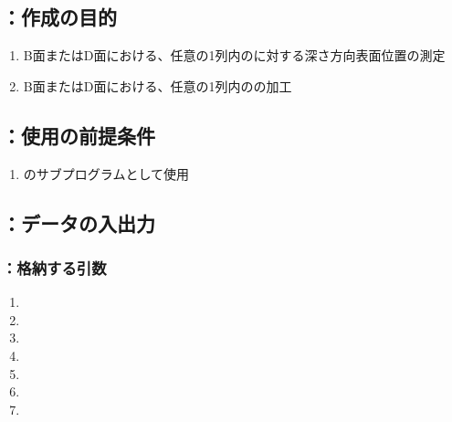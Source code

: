 \clearpage


\subsection{\DLtwoBD：作成の目的}
\begin{enumerate}[label*=\sarrow]
\item B面またはD面における、任意の1列内の\Dimple に対する深さ方向表面位置の測定
\item B面またはD面における、任意の1列内の\Dimple の加工
\end{enumerate}


\subsection{\DLtwoBD：使用の前提条件}
\begin{enumerate}[label*=\sarrow]
\item \DLone のサブプログラムとして使用
\end{enumerate}


\subsection{\DLtwoBD：データの入出力}

\subsubsection{\DLtwoBD：格納する引数}
\begin{enumerate}[label*=\sarrow]
\item \PMBDFaceSelectionFlag
\item \PMDimpleAngle
\item \PMDimpleHorizontalPitch
\item \PMDimpleOddRowLength
\item \PMDimpleEvenRowLength
\item \PMDimpleRowNum
\item \PMDimpleDepth
\end{enumerate}

